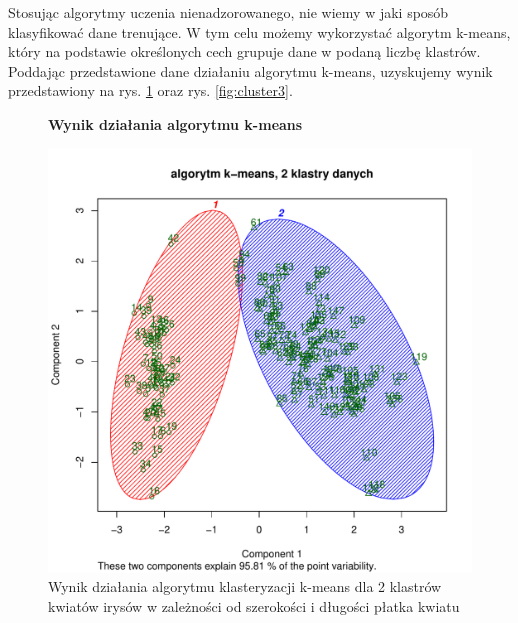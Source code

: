 Stosując algorytmy uczenia nienadzorowanego, nie wiemy w jaki sposób klasyfikować dane trenujące. W tym celu możemy 
wykorzystać algorytm k-means\cite{coates2012learning}, który na podstawie określonych cech grupuje dane w podaną liczbę 
klastrów.
Poddając przedstawione dane działaniu algorytmu k-means, uzyskujemy wynik przedstawiony na rys. \ref{fig:cluster2} oraz 
rys. \ref{fig:cluster3}.


\begin{figure}[h!]
    \centering
    \textbf{Wynik działania algorytmu k-means}\par\medskip
    \includegraphics[scale=0.5]{cluster2}
    \caption{Wynik działania algorytmu klasteryzacji k-means dla 2 klastrów kwiatów irysów w zależności od szerokości i 
długości płatka kwiatu}
    \label{fig:cluster2}
\end{figure}

